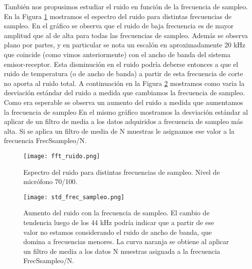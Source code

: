 \documentclass[a4paper, 11pt]{article}
\begin{document}
 
También nos propusimos estudiar el ruido en función de la frecuencia de sampleo. En la Figura \ref{fig:fft_ruido} mostramos el espectro del ruido para distintas frecuencias de sampleo. En el gráfico se observa que el ruido de baja frecuencia es de mayor amplitud que al de alta para todas las frecuencias de sampleo. Además se observa plano por partes, y en particular se nota un escalón en aproximadamente 20 kHz que coincide (como vimos anteriormente) con el ancho de banda del sistema emisor-receptor. Esta disminución en el ruido podría deberse entonces a que el ruido de temperatura (o de ancho de banda) a partir de esta frecuencia de corte no aporta al ruido total. A continuación en la Figura \ref{fig:std_frec_sampleo} mostramos como varia la desviación estándar del ruido a medida que cambiamos la frecuencia de sampleo. Como era esperable se observa un aumento del ruido a medida que aumentamos la frecuencia de sampleo %
En el mismo gráfico mostramos la desviación estándar al aplicar de un filtro de media a los datos adquiridos a frecuencia de sampleo más alta. Si se aplica un filtro de media de N muestras le asignamos ese valor a la frecuencia FrecSsampleo/N. 

\begin{figure} [H]
\centering
\texttt{[image: fft\_ruido.png]}
\caption{Espectro del ruido para distintas frecuencias de sampleo. Nivel de micrófono 70/100. \label{fig:fft_ruido}}
\end{figure} 

\begin{figure} [H]
\centering
\texttt{[image: std\_frec\_sampleo.png]}
\caption{Aumento del ruido con la frecuencia de sampleo. El cambio de tendencia luego de los 44 kHz podría indicar que a partir de ese valor no estamos considerando el ruido de ancho de banda, que domina a frecuencias menores. La curva naranja se obtiene al aplicar un filtro de media a los datos N muestras asignada a la frecuencia FrecSsampleo/N.\label{fig:std_frec_sampleo}}
\end{figure} 
\end{document}
